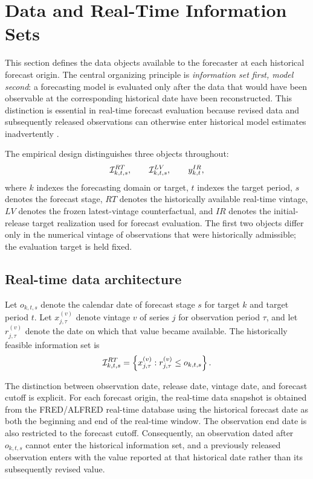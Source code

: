 \section{Data and Real-Time Information Sets}
\label{sec:data}

This section defines the data objects available to the forecaster at each
historical forecast origin. The central organizing principle is
\emph{information set first, model second}: a forecasting model is evaluated
only after the data that would have been observable at the corresponding
historical date have been reconstructed. This distinction is essential in
real-time forecast evaluation because revised data and subsequently released
observations can otherwise enter historical model estimates inadvertently
\citep{croushorestark2001realtime,croushore2011frontiers,koenig2003useabuse}.

The empirical design distinguishes three objects throughout:
\begin{equation}
    \mathcal{I}^{RT}_{k,t,s},
    \qquad
    \mathcal{I}^{LV}_{k,t,s},
    \qquad
    y^{IR}_{k,t},
    \label{eq:three_data_objects}
\end{equation}
where $k$ indexes the forecasting domain or target, $t$ indexes the target
period, $s$ denotes the forecast stage, $RT$ denotes the historically
available real-time vintage, $LV$ denotes the frozen latest-vintage
counterfactual, and $IR$ denotes the initial-release target realization used
for forecast evaluation. The first two objects differ only in the numerical
vintage of observations that were historically admissible; the evaluation
target is held fixed.

\subsection{Real-time data architecture}
\label{subsec:realtime_architecture}

Let $o_{k,t,s}$ denote the calendar date of forecast stage $s$ for target $k$
and target period $t$. Let $x_{j,\tau}^{(v)}$ denote vintage $v$ of series $j$
for observation period $\tau$, and let $r_{j,\tau}^{(v)}$ denote the date on
which that value became available. The historically feasible information set
is
\begin{equation}
    \mathcal{I}^{RT}_{k,t,s}
    =
    \left\{
        x_{j,\tau}^{(v)} :
        r_{j,\tau}^{(v)} \leq o_{k,t,s}
    \right\}.
    \label{eq:information_set}
\end{equation}

The distinction between observation date, release date, vintage date, and
forecast cutoff is explicit. For each forecast origin, the real-time data
snapshot is obtained from the FRED/ALFRED real-time database using the
historical forecast date as both the beginning and end of the real-time
window. The observation end date is also restricted to the forecast cutoff.
Consequently, an observation dated after $o_{k,t,s}$ cannot enter the
historical information set, and a previously released observation enters with
the value reported at that historical date rather than its subsequently
revised value.

